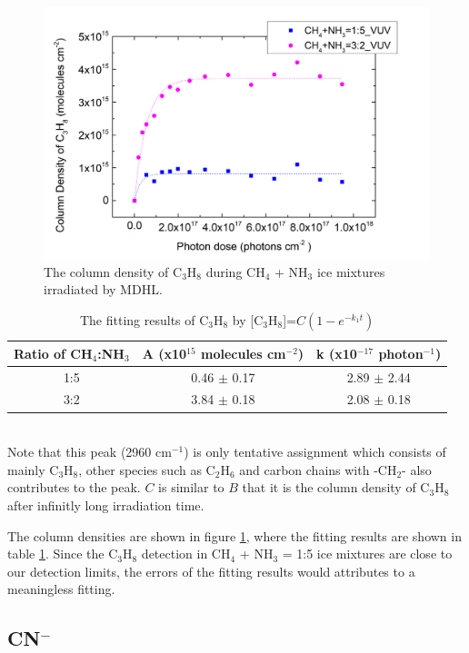 \begin{figure}
\centering
\includegraphics[width=\textwidth]{figures/chapter3/C3H8_VUV.png}
\caption{The column density of C$_3$H$_8$ during CH$_4$ + NH$_3$ ice mixtures irradiated by MDHL. }
\label{fig:lab_C3H8}
\end{figure}

\begin{table}[htbp]
\caption{The fitting results of C$_3$H$_8$ by [C$_3$H$_8$]=$C(1 - e^{-k_1 t})$}
\label{tab:fittingC3H8}
\begin{tabular}{ccc}
\hline
\hline
Ratio of CH$_4$:NH$_3$ & A (x10$^{15}$ molecules cm$^{-2}$) & k (x10$^{-17}$ photon$^{-1}$) \\
\hline
1:5 & 0.46 $\pm$ 0.17 & 2.89 $\pm$ 2.44 \\
3:2 & 3.84 $\pm$ 0.18 & 2.08 $\pm$ 0.18 \\
\hline
\end{tabular}\\
Note that this peak (2960 cm$^{-1}$) is only tentative assignment which consists of mainly C$_3$H$_8$, other species such as C$_2$H$_6$ and carbon chains with -CH$_2$- also contributes to the peak. $C$ is similar to $B$ that it is the column density of C$_3$H$_8$ after infinitly long irradiation time.
\end{table}

The column densities are shown in figure \ref{fig:lab_C3H8}, where the fitting results are shown in table \ref{tab:fittingC3H8}. Since the C$_3$H$_8$ detection in CH$_4$ + NH$_3$ = 1:5 ice mixtures are close to our detection limits, the errors of the fitting results would attributes to a meaningless fitting.

\subsection{CN$^-$}

